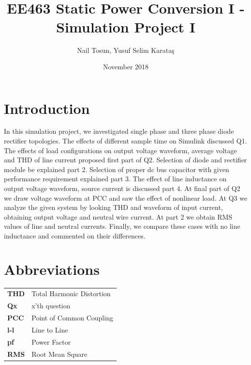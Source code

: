 \documentclass[fleqn, a4paper]{report}
\title{EE463 Static Power Conversion I 
-Simulation Project I}
\author{Nail Tosun, Yusuf Selim Karataş}
\date{November 2018}
\begin{document}
\maketitle

\section*{Introduction}
In this simulation project, we investigated single phase and three phase diode rectifier topologies. The effects of different sample time on Simulink discussed Q1. The effects of load configurations on output voltage waveform, average voltage and THD of line current proposed first part of Q2. Selection of diode and rectifier module be explained part 2. Selection of proper dc bus capacitor with given performance requirement explained part 3. The effect of line inductance on output voltage waveform, source current is discussed part 4. At final part of Q2 we draw voltage waveform at PCC and saw the effect of nonlinear load. 
At Q3 we analyze the given system by looking THD and waveform of input current, obtaining output voltage and neutral wire current. At part 2 we obtain RMS values of line and neutral currents. Finally, we compare these cases with no line inductance and commented on their differences. 
\section*{Abbreviations}
\begin{table}[H]
\begin{tabular}{ll}
\textbf{THD} & Total Harmonic Distortion \\
\textbf{Qx}  & x'th question \\
\textbf{PCC} & Point of Common Coupling \\
\textbf{l-l} & Line to Line \\
\textbf{pf} & Power Factor \\
\textbf{RMS} & Root Mean Square
\end{tabular}
\end{table}
\end{document}

